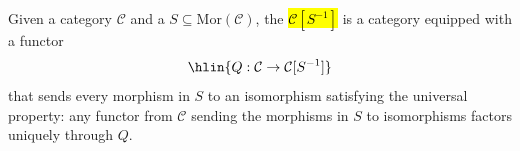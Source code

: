 
\begin{definition} \label{definition:localization_of_a_category_by_a_multiplicative_system}
    Given a category $\mathcal{C}$ and a  $S \subseteq \mathrm{Mor}(\mathcal{C})$, the  \hl{$\mathcal{C}[S^{-1}]$} is a category equipped with a functor
        $$\hlin{Q: \mathcal{C} \to \mathcal{C}[S^{-1}]}$$
    that sends every morphism in $S$ to an isomorphism satisfying the universal property: any functor from $\mathcal{C}$ sending the morphisms in $S$ to isomorphisms factors uniquely through $Q$.
\end{definition}
